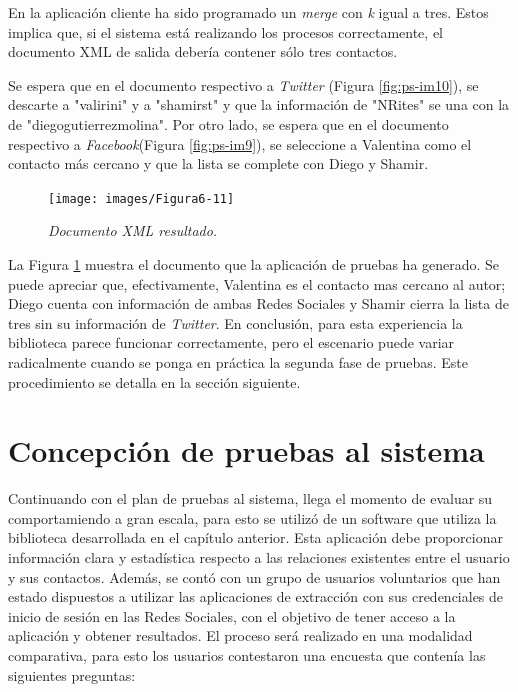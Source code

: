 En la aplicación cliente ha sido programado un \textit{merge} con \textit{k} igual a tres. Estos implica que, si el sistema está realizando los procesos correctamente, el documento XML de salida debería contener sólo tres contactos. 

Se espera que en el documento respectivo a \textit{Twitter} (Figura \ref{fig:ps-im10}), se descarte a "valirini" y a "shamirst" y que la información de "NRites" se una con la de "diegogutierrezmolina". Por otro lado, se espera que en el documento respectivo a \textit{Facebook}(Figura \ref{fig:ps-im9}), se seleccione a Valentina como el contacto más cercano y que la lista se complete con Diego y Shamir.

\begin{figure}[H]
	\centering
	\texttt{[image: images/Figura6-11]}
	\caption{\em Documento XML resultado.}
	\label{fig:ps-im11}
\end{figure}


La Figura \ref{fig:ps-im11} muestra el documento que la aplicación de pruebas ha generado. Se puede apreciar que, efectivamente, Valentina es el contacto mas cercano al autor; Diego cuenta con información de ambas Redes Sociales y Shamir cierra la lista de tres sin su información de \textit{Twitter}. En conclusión, para esta experiencia la biblioteca parece funcionar correctamente, pero el escenario puede variar radicalmente cuando se ponga en práctica la segunda fase de pruebas. Este procedimiento se detalla en la sección siguiente.


\section{Concepción de pruebas al sistema}

Continuando con el plan de pruebas al sistema, llega el momento de evaluar su comportamiendo a gran escala, para esto se utilizó de un software que utiliza la biblioteca desarrollada en el capítulo anterior. Esta aplicación debe proporcionar información clara y estadística respecto a las relaciones existentes entre el usuario y sus contactos. Además, se contó con un grupo de usuarios voluntarios que han estado dispuestos a utilizar las aplicaciones de extracción con sus credenciales de inicio de sesión en las Redes Sociales, con el objetivo de tener acceso a la aplicación y obtener resultados. El proceso será realizado en una modalidad comparativa, para esto los usuarios contestaron una encuesta que contenía las siguientes preguntas:

